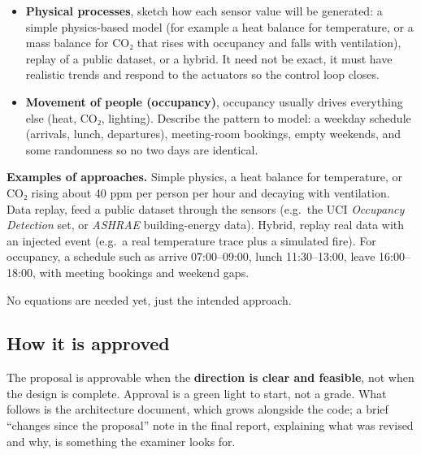 \documentclass[
  11pt,
]{article}
\providecommand{\tightlist}{%
  \setlength{\itemsep}{0pt}\setlength{\parskip}{0pt}}
\begin{document}
\begin{itemize}
\tightlist
\item
  \textbf{Physical processes}, sketch how each sensor value will be
  generated: a simple physics-based model (for example a heat balance
  for temperature, or a mass balance for CO₂ that rises with occupancy
  and falls with ventilation), replay of a public dataset, or a hybrid.
  It need not be exact, it must have realistic trends and respond to
  the actuators so the control loop closes.
\item
  \textbf{Movement of people (occupancy)}, occupancy usually drives
  everything else (heat, CO₂, lighting). Describe the pattern to
  model: a weekday schedule (arrivals, lunch, departures), meeting-room
  bookings, empty weekends, and some randomness so no two days are
  identical.
\end{itemize}

\textbf{Examples of approaches.} Simple physics, a heat balance for
temperature, or CO₂ rising about 40 ppm per person per hour and decaying
with ventilation. Data replay, feed a public dataset through the
sensors (e.g.~the UCI \emph{Occupancy Detection} set, or \emph{ASHRAE}
building-energy data). Hybrid, replay real data with an injected
event (e.g.~a real temperature trace plus a simulated fire). For
occupancy, a schedule such as arrive 07:00--09:00, lunch 11:30--13:00,
leave 16:00--18:00, with meeting bookings and weekend gaps.

No equations are needed yet, just the intended approach.

\hypertarget{how-it-is-approved}{%
\subsection{How it is approved}\label{how-it-is-approved}}

The proposal is approvable when the \textbf{direction is clear and
feasible}, not when the design is complete. Approval is a green light
to start, not a grade. What follows is the architecture document, which
grows alongside the code; a brief ``changes since the proposal'' note
in the final report, explaining what was revised and why, is something
the examiner looks for.
\end{document}
